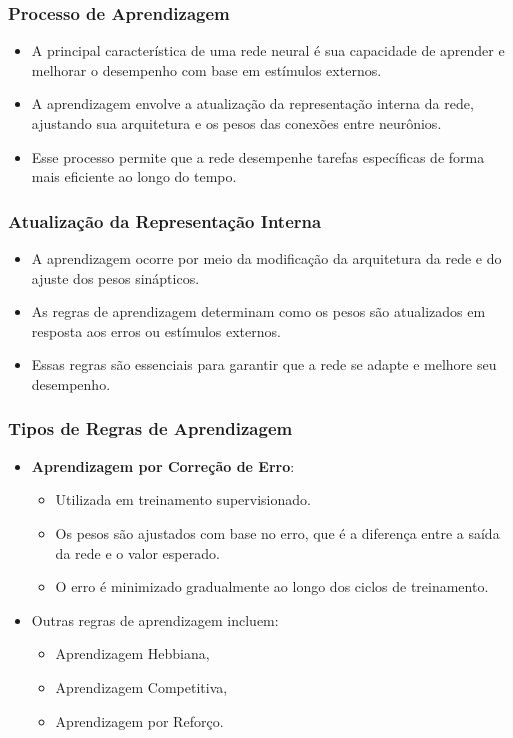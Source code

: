 \documentclass{beamer}
\begin{document}
\begin{frame}
\frametitle{Processo de Aprendizagem}
\begin{itemize}
    \item A principal característica de uma rede neural é sua capacidade de aprender e melhorar o desempenho com base em estímulos externos.
    \item A aprendizagem envolve a atualização da representação interna da rede, ajustando sua arquitetura e os pesos das conexões entre neurônios.
    \item Esse processo permite que a rede desempenhe tarefas específicas de forma mais eficiente ao longo do tempo.
\end{itemize}
\end{frame}

\begin{frame}
\frametitle{Atualização da Representação Interna}
\begin{itemize}
    \item A aprendizagem ocorre por meio da modificação da arquitetura da rede e do ajuste dos pesos sinápticos.
    \item As regras de aprendizagem determinam como os pesos são atualizados em resposta aos erros ou estímulos externos.
    \item Essas regras são essenciais para garantir que a rede se adapte e melhore seu desempenho.
\end{itemize}
\end{frame}

\begin{frame}
\frametitle{Tipos de Regras de Aprendizagem}
\begin{itemize}
    \item \textbf{Aprendizagem por Correção de Erro}:
    \begin{itemize}
        \item Utilizada em treinamento supervisionado.
        \item Os pesos são ajustados com base no erro, que é a diferença entre a saída da rede e o valor esperado.
        \item O erro é minimizado gradualmente ao longo dos ciclos de treinamento.
    \end{itemize}
    \item Outras regras de aprendizagem incluem:
    \begin{itemize}
        \item Aprendizagem Hebbiana,
        \item Aprendizagem Competitiva,
        \item Aprendizagem por Reforço.
    \end{itemize}
\end{itemize}
\end{frame}
\end{document}
